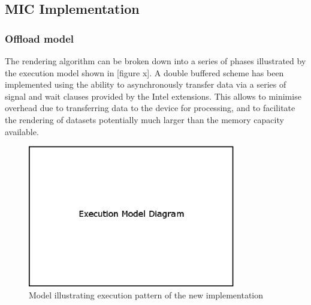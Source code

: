 \documentclass[runningheads,a4paper]{llncs}
\begin{document}


\subsection{MIC Implementation}
\label{sect:micimplementation}




\subsubsection{Offload model}
\label{sect:offloadmodel}

The rendering algorithm can be broken down into a series of phases illustrated by the execution model shown in [figure x]. 
A double buffered scheme has been implemented using the ability to asynchronously transfer data via a series of signal 
and wait clauses provided by the Intel extensions. This allows to minimise overhead due to transferring data to the device 
for processing, and to facilitate the rendering of datasets potentially much larger than the memory capacity available.

\begin{figure}
\centering
\includegraphics[height=6.2cm]{exmodel}
\caption{Model illustrating execution pattern of the new implementation}
\label{fig:executionmodel}
\end{figure}
\end{document}
